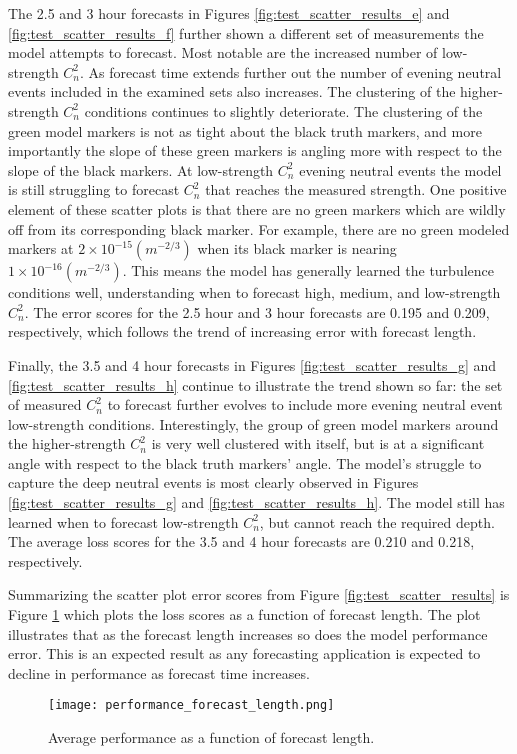 The 2.5 and 3 hour forecasts in Figures \ref{fig:test_scatter_results_e} and \ref{fig:test_scatter_results_f} further shown a different set of measurements the model attempts to forecast. Most notable are the increased number of low-strength $C_{n}^{2}$. As forecast time extends further out the number of evening neutral events included in the examined sets also increases. The clustering of the higher-strength $C_{n}^{2}$ conditions continues to slightly deteriorate. The clustering of the green model markers is not as tight about the black truth markers, and more importantly the slope of these green markers is angling more with respect to the slope of the black markers. At low-strength $C_{n}^{2}$ evening neutral events the model is still struggling to forecast $C_{n}^{2}$ that reaches the measured strength. One positive element of these scatter plots is that there are no green markers which are wildly off from its corresponding black marker. For example, there are no green modeled markers at $2 \times 10^{-15} (m^{-2/3})$ when its black marker is nearing $1 \times 10^{-16} (m^{-2/3})$. This means the model has generally learned the turbulence conditions well, understanding when to forecast high, medium, and low-strength $C_{n}^{2}$. The error scores for the 2.5 hour and 3 hour forecasts are 0.195 and 0.209, respectively, which follows the trend of increasing error with forecast length.

Finally, the 3.5 and 4 hour forecasts in Figures \ref{fig:test_scatter_results_g} and \ref{fig:test_scatter_results_h} continue to illustrate the trend shown so far: the set of measured $C_{n}^{2}$ to forecast further evolves to include more evening neutral event low-strength conditions. Interestingly, the group of green model markers around the higher-strength $C_{n}^{2}$ is very well clustered with itself, but is at a significant angle with respect to the black truth markers' angle. The model's struggle to capture the deep neutral events is most clearly observed in Figures \ref{fig:test_scatter_results_g} and \ref{fig:test_scatter_results_h}. The model still has learned when to forecast low-strength $C_{n}^{2}$, but cannot reach the required depth. The average loss scores for the 3.5 and 4 hour forecasts are 0.210 and 0.218, respectively.

Summarizing the scatter plot error scores from Figure \ref{fig:test_scatter_results} is Figure \ref{fig:performance_forecast_length} which plots the loss scores as a function of forecast length. The plot illustrates that as the forecast length increases so does the model performance error. This is an expected result as any forecasting application is expected to decline in performance as forecast time increases.
\begin{figure}[h!]
	\centering
	\texttt{[image: performance\_forecast\_length.png]}
	\caption{Average performance as a function of forecast length.}
	\label{fig:performance_forecast_length}
\end{figure}

